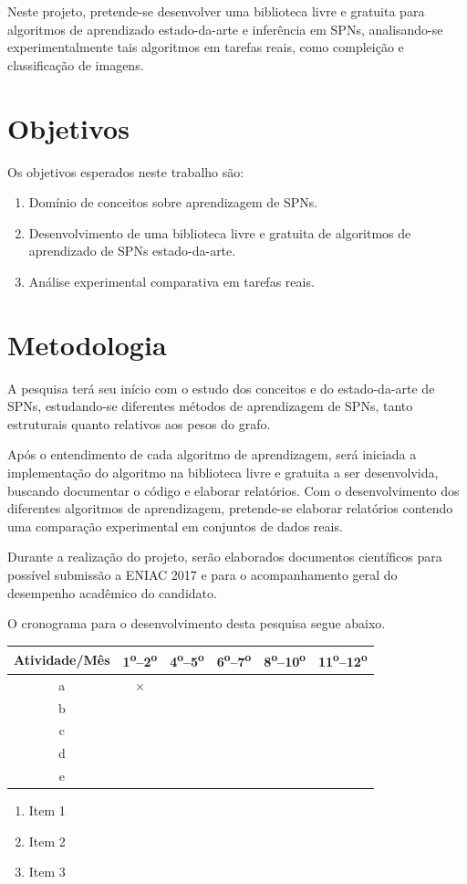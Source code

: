 \documentclass[12pt]{article}
\newcommand{\tsup}{\textsuperscript}
\theoremstyle{plain}
\numberwithin{equation}{section}
\begin{document}
Neste projeto, pretende-se desenvolver uma biblioteca livre e gratuita para algoritmos de
aprendizado estado-da-arte e inferência em SPNs, analisando-se experimentalmente tais algoritmos em
tarefas reais, como compleição e classificação de imagens.
\newpage

\section{Objetivos}

Os objetivos esperados neste trabalho são:

\begin{enumerate}
  \item Domínio de conceitos sobre aprendizagem de SPNs.
  \item Desenvolvimento de uma biblioteca livre e gratuita de algoritmos de aprendizado de SPNs
    estado-da-arte.
  \item Análise experimental comparativa em tarefas reais.
\end{enumerate}

\section{Metodologia}

A pesquisa terá seu início com o estudo dos conceitos e do estado-da-arte de SPNs, estudando-se
diferentes métodos de aprendizagem de SPNs, tanto estruturais quanto relativos aos pesos do grafo.

Após o entendimento de cada algoritmo de aprendizagem, será iniciada a implementação do algoritmo
na biblioteca livre e gratuita a ser desenvolvida, buscando documentar o código e elaborar
relatórios. Com o desenvolvimento dos diferentes algoritmos de aprendizagem, pretende-se elaborar
relatórios contendo uma comparação experimental em conjuntos de dados reais.

Durante a realização do projeto, serão elaborados documentos científicos para possível submissão a
ENIAC 2017 e para o acompanhamento geral do desempenho acadêmico do candidato.

O cronograma para o desenvolvimento desta pesquisa segue abaixo.


\begin{table}[h]
  \centering
  \begin{tabular}{|c|c|c|c|c|c|}
    \hline
    Atividade/Mês & 1\tsup{o}--2\tsup{o} & 4\tsup{o}--5\tsup{o} & 6\tsup{o}--7\tsup{o} &
    8\tsup{o}--10\tsup{o} & 11\tsup{o}--12\tsup{o} \\ \hline
    a & $\times$ & & & & \\ \hline
    b & & & & & \\ \hline
    c & & & & & \\ \hline
    d & & & & & \\ \hline
    e & & & & & \\
    \hline
  \end{tabular}
\end{table}

\begin{enumerate}[label=\alph*.]
  \item Item 1
  \item Item 2
  \item Item 3
\end{enumerate}

\printbibliography[]
\end{document}
